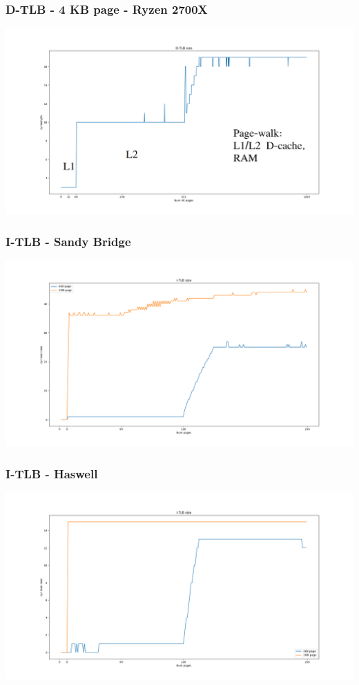 \documentclass{beamer}
\begin{document}
\begin{frame}
\frametitle{D-TLB - 4 KB page - Ryzen 2700X}
\centerline{\includegraphics[scale=.23]{img/dtlb_size_zen.png}}
\end{frame}

\begin{frame}
\frametitle{I-TLB - Sandy Bridge}
\centerline{\includegraphics[scale=.3]{img/itlb_size_sandybridge.png}}
\end{frame}

\begin{frame}
\frametitle{I-TLB - Haswell}
\centerline{\includegraphics[scale=.3]{img/itlb_size_haswell.png}}
\end{frame}
\end{document}
